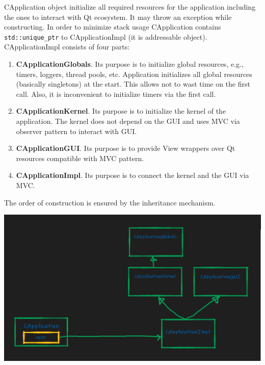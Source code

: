 \documentclass{article}
\begin{document}
CApplication object initialize all required resources for the application including the ones to interact with Qt ecosystem. It may throw an exception while constructing. In order to minimize stack usage CApplication contains \verb"std::unique_ptr" to CApplicationImpl (it is addressable object). CApplicationImpl consists of four parts:
\begin{enumerate}
\item \textbf{CApplicationGlobals}. Its purpose is to initialize global resources, e.g., timers, loggers, thread pools, etc. Application initializes all global resources (basically singletons) at the start. This allows not to wast time on the first call. Also, it is inconvenient to initialize timers via the first call.
\item \textbf{CApplicationKernel}. Its purpose is to initialize the kernel of the application. The kernel does not depend on the GUI and uses MVC via observer pattern to interact with GUI.
\item \textbf{CApplicationGUI}. Its purpose is to provide View wrappers over Qt resources compatible with MVC pattern.
\item \textbf{CApplicationImpl}. Its purpose is to connect the kernel and the GUI via MVC.
\end{enumerate}
The order of construction is ensured by the inheritance mechanism.
\begin{center}
\includegraphics[scale = 0.3]{Figures/CApplicationStructure.png}
\end{center}
	
\end{document}
